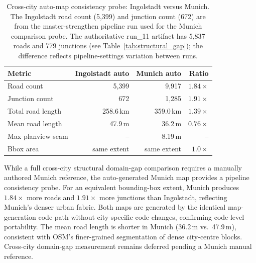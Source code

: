 \begin{table}[htbp]
\centering
\small
\begin{tabular}{lrrr}
\toprule
Metric & Ingolstadt auto & Munich auto & Ratio \\
\midrule
Road count & 5{,}399 & 9{,}917 & $1.84\times$ \\
Junction count & 672 & 1{,}285 & $1.91\times$ \\
Total road length & 258.6\,km & 359.0\,km & $1.39\times$ \\
Mean road length & 47.9\,m & 36.2\,m & $0.76\times$ \\
Max planview seam & -- & 8.19\,m & -- \\
Bbox area & same extent & same extent & $1.0\times$ \\
\bottomrule
\end{tabular}
\caption{Cross-city auto-map consistency probe: Ingolstadt versus Munich. The Ingolstadt road count (5{,}399) and junction count (672) are from the master-strengthen pipeline run used for the Munich comparison probe. The authoritative run\_11 artifact has 5{,}837 roads and 779 junctions (see Table~\ref{tab:structural_gap}); the difference reflects pipeline-settings variation between runs.}
\label{tab:munich_cross_city_consistency}
\end{table}

While a full cross-city structural domain-gap comparison requires a manually authored Munich reference, the auto-generated Munich map provides a pipeline consistency probe. For an equivalent bounding-box extent, Munich produces $1.84\times$ more roads and $1.91\times$ more junctions than Ingolstadt, reflecting Munich's denser urban fabric. Both maps are generated by the identical map-generation code path without city-specific code changes, confirming code-level portability. The mean road length is shorter in Munich (36.2\,m vs.\ 47.9\,m), consistent with OSM's finer-grained segmentation of dense city-centre blocks. Cross-city domain-gap measurement remains deferred pending a Munich manual reference.

